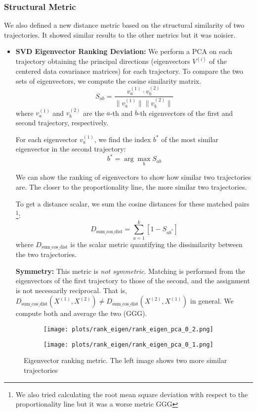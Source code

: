 \documentclass[a4paper,12pt]{article}
\begin{document}
\subsubsection{Structural Metric}
\label{subsubsec:structural_metric} %
We also defined a new distance metric based on the structural similarity of two trajectories. It showed similar results to the other metrics but it was noisier.
\begin{itemize}
        
    \item \textbf{SVD Eigenvector Ranking Deviation:} We perform a PCA on each trajectory obtaining the principal directions (eigenvectors $V^{(i)}$ of the centered data covariance matrices) for each trajectory. To compare the two sets of eigenvectors, we compute the cosine similarity matrix.
    \[
    S_{ab} = \frac{v^{(1)}_a \cdot v^{(2)}_b}{\|v^{(1)}_a\| \|v^{(2)}_b\|}
    \]
    where $v^{(1)}_a$ and $v^{(2)}_b$ are the $a$-th and $b$-th eigenvectors of the first and second trajectory, respectively.

    For each eigenvector $v^{(1)}_a$, we find the index $b^*$ of the most similar eigenvector in the second trajectory:
    \[
    b^* = \arg\max_b S_{ab}
    \]

    We can show the ranking of eigenvectors to show how similar two trajectories are. The closer to the proportionality line, the more similar two trajectories.

    To get a distance scalar, we sum the cosine distances for these matched pairs \footnote{We also tried calculating the root mean square deviation with respect to the proportionality line but it was a worse metric GGG}:
    \[
    D_{\text{sum\_cos\_dist}} = \sum_{a=1}^k \left[1 - S_{a b^*}\right]
    \]
    where $D_{\text{sum\_cos\_dist}}$ is the scalar metric quantifying the dissimilarity between the two trajectories.

    \textbf{Symmetry:} This metric is \emph{not symmetric}. Matching is performed from the eigenvectors of the first trajectory to those of the second, and the assignment is not necessarily reciprocal. That is, $D_{\text{sum\_cos\_dist}}(X^{(1)}, X^{(2)}) \neq D_{\text{sum\_cos\_dist}}(X^{(2)}, X^{(1)})$ in general. We compute both and average the two (GGG).

\end{itemize}

    \begin{figure}[H]
    \centering
    \begin{subfigure}[b]{0.48\linewidth}
        \centering
        \texttt{[image: plots/rank\_eigen/rank\_eigen\_pca\_0\_2.png]}
    \end{subfigure}\hfill
    \begin{subfigure}[b]{0.48\linewidth}
        \centering
        \texttt{[image: plots/rank\_eigen/rank\_eigen\_pca\_0\_1.png]}
    \end{subfigure}
    \caption{Eigenvector ranking metric. The left image shows two more similar trajectories}
    \label{fig:rank_eigen}
\end{figure}
\end{document}
